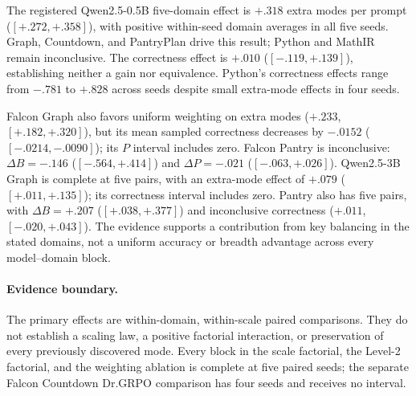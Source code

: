 \documentclass{article}
\newcommand{\1}{\mathbf 1}
\theoremstyle{remark}
\theoremstyle{definition}
\theoremstyle{plain}
\begin{document}
\begin{table}[H]
  \centering
  \caption{\textbf{Uniform versus fresh-frequency replay at pass 8.}
  Effects are uniform minus frequency weighting. Brackets give the paired
  percentile bootstrap interval for $\Delta B$ over all $5^5$ ordered
  resamples in complete blocks. All nine
  blocks contain five seed pairs
  (\href{https://huggingface.co/od2961/maxent-grpo-models/blob/main/experiments/E120-R1/README.md\#comparators}{paired model exports}).}
  \label{tab:current-e120}
  \scriptsize
  \setlength{\tabcolsep}{3pt}
\end{table}


The registered Qwen2.5-0.5B five-domain effect is $+.318$ extra modes per
prompt ($[+.272,+.358]$), with positive within-seed domain averages in all
five seeds. Graph, Countdown, and PantryPlan drive this result; Python and
MathIR remain inconclusive. The correctness effect is $+.010$
($[-.119,+.139]$), establishing neither a gain nor equivalence. Python's
correctness effects range from $-.781$ to $+.828$ across seeds despite
small extra-mode effects in four seeds.

Falcon Graph also favors uniform weighting on extra modes ($+.233$,
$[+.182,+.320]$), but its mean sampled correctness decreases by $-.0152$
($[-.0214,-.0090]$); its $P$ interval includes zero. Falcon Pantry is
inconclusive: $\Delta B=-.146$ ($[-.564,+.414]$) and $\Delta P=-.021$
($[-.063,+.026]$). Qwen2.5-3B Graph is complete at five pairs, with an extra-mode effect of
$+.079$ ($[+.011,+.135]$); its correctness interval includes zero.
Pantry also has five pairs, with $\Delta B=+.207$
($[+.038,+.377]$) and inconclusive correctness ($+.011$, $[-.020,+.043]$).
The evidence supports a contribution from key balancing in the stated domains, not a
uniform accuracy or breadth advantage across every model--domain block.

\paragraph{Evidence boundary.}
\label{app:scale-boundary}
The primary effects are within-domain, within-scale paired comparisons.
They do not establish a scaling law, a positive factorial interaction, or
preservation of every previously discovered mode. Every block in the scale
factorial, the Level-2 factorial, and the weighting ablation is complete at
five paired seeds; the separate Falcon Countdown Dr.GRPO comparison has four
seeds and receives no interval.
\end{document}
